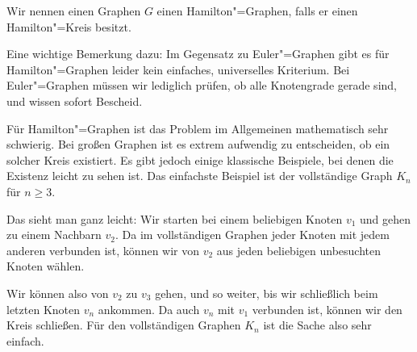 \begin{spoken-clean}[00:32:29 - 00:34:16]
Wir nennen einen Graphen $G$ einen Hamilton"=Graphen, falls er einen Hamilton"=Kreis besitzt.

Eine wichtige Bemerkung dazu: Im Gegensatz zu Euler"=Graphen gibt es für Hamilton"=Graphen leider kein einfaches, universelles Kriterium. Bei Euler"=Graphen müssen wir lediglich prüfen, ob alle Knotengrade gerade sind, und wissen sofort Bescheid.

Für Hamilton"=Graphen ist das Problem im Allgemeinen mathematisch sehr schwierig. Bei großen Graphen ist es extrem aufwendig zu entscheiden, ob ein solcher Kreis existiert. Es gibt jedoch einige klassische Beispiele, bei denen die Existenz leicht zu sehen ist. Das einfachste Beispiel ist der vollständige Graph $K_n$ für $n \ge 3$.
\end{spoken-clean}

\begin{ai-global-state-checkpoint-invisible-content}
\end{ai-global-state-checkpoint-invisible-content}

\begin{math-stroke}
\end{math-stroke}

\begin{spoken-clean}[00:34:16 - 00:35:22]
Das sieht man ganz leicht: Wir starten bei einem beliebigen Knoten $v_1$ und gehen zu einem Nachbarn $v_2$. Da im vollständigen Graphen jeder Knoten mit jedem anderen verbunden ist, können wir von $v_2$ aus jeden beliebigen unbesuchten Knoten wählen.

Wir können also von $v_2$ zu $v_3$ gehen, und so weiter, bis wir schließlich beim letzten Knoten $v_n$ ankommen. Da auch $v_n$ mit $v_1$ verbunden ist, können wir den Kreis schließen. Für den vollständigen Graphen $K_n$ ist die Sache also sehr einfach.
\end{spoken-clean}

